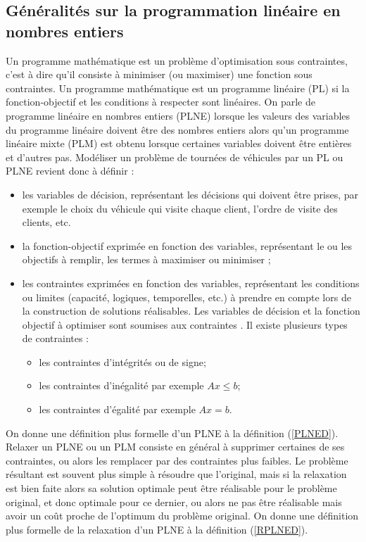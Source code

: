 \subsection{Généralités sur la programmation linéaire en nombres entiers}
Un programme mathématique est un problème d'optimisation sous contraintes, c'est à
dire qu'il consiste à minimiser (ou maximiser) une fonction sous contraintes. Un programme mathématique est un programme linéaire (PL) si la fonction-objectif
et les conditions à respecter sont linéaires. On parle de programme linéaire en
nombres entiers (PLNE) lorsque les valeurs des variables du programme linéaire doivent
être des nombres entiers alors qu'un programme linéaire mixte (PLM) est obtenu lorsque
certaines variables doivent être entières et d'autres pas.
Modéliser un problème de tournées de véhicules par un PL ou PLNE revient donc à
définir :
\begin{itemize}[label=$\square$]
	\item les variables de décision, représentant les décisions qui doivent être prises, par exemple le choix
	du véhicule qui visite chaque client, l'ordre de visite des clients, etc.
	\item  la fonction-objectif exprimée en fonction des variables, représentant le ou les objectifs
	à remplir, les termes à maximiser ou minimiser ;
	\item les contraintes exprimées en fonction des variables, représentant les conditions ou
	limites (capacité, logiques, temporelles, etc.) à prendre en compte lors de la construction de solutions réalisables. Les variables de décision et la fonction objectif à optimiser sont soumises aux contraintes . Il existe plusieurs types de contraintes : 
	\begin{itemize}
		\item les contraintes d'intégrités ou de signe;
		\item les contraintes d'inégalité par exemple $Ax \leq b $;
		\item les contraintes d'égalité par exemple $Ax = b $.
	\end{itemize}
\end{itemize}
On donne une définition plus formelle d'un PLNE à la définition (\ref{PLNED}).
Relaxer un PLNE ou un PLM consiste en général à supprimer certaines de ses contraintes,
ou alors les remplacer par des contraintes plus faibles. Le problème résultant est souvent
plus simple à résoudre que l'original, mais si la relaxation est bien faite alors sa solution
optimale peut être réalisable pour le problème original, et donc optimale pour ce dernier,
ou alors ne pas être réalisable mais avoir un coût proche de l'optimum du problème original. On donne une définition plus formelle de la relaxation d'un PLNE à la définition (\ref{RPLNED}).

